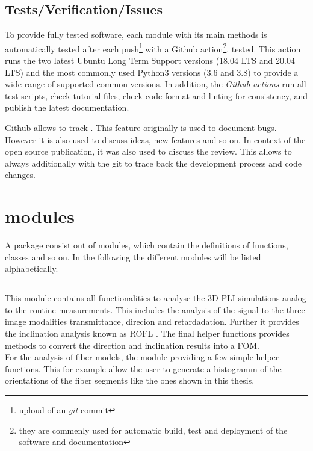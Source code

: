\subsection{Tests/Verification/Issues}
% 
To provide fully tested software, each module with its main methods is automatically tested after each push\footnote{uploud of an \textit{git} commit} with a Github action\footnote{they are commenly used for automatic build, test and deployment of the software and documentation}. tested.
This action runs the two latest Ubuntu Long Term Support versions (18.04 LTS and 20.04 LTS) and the most commonly used Python3 versions (3.6 and 3.8) to provide a wide range of supported common versions.
In addition, the \textit{Github actions} run all test scripts, check tutorial files, check code format and linting for consistency, and publish the latest documentation.
% 
\par
% 
Github allows to track .
This feature originally is used to document bugs.
However it is also used to discuss ideas, new features and so on.
In context of the open source publication, it was also used to discuss the review.
This allows to always additionally with the git  to trace back the development process and code changes.
%
%  
% 
%  
\section{modules}
% 
A \python{} package consist out of modules, which contain the definitions of functions, classes and so on.
In the following the different modules will be listed alphabetically.
% 
% 
% 
\subsection{}
% 
This module contains all functionalities to analyse the \ac{3D-PLI} simulations analog to the routine measurements.
This includes the analysis of the signal to the three image modalities transmittance, direcion and retardadation.
Further it provides the inclination analysis known as \ac{ROFL} \cite{Schmitz2018}.
The final helper functions provides methods to convert the direction and inclination results into a \ac{FOM}.
\\
For the analysis of fiber models, the module providing a few simple helper functions.
This for example allow the user to generate a histogramm of the orientations of the fiber segments like the ones shown in this thesis.
% 
